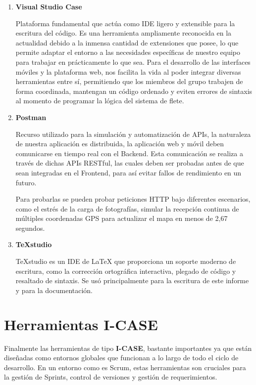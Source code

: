 \begin{enumerate}
	\item \textbf{Visual Studio Case}
	
	Plataforma fundamental que actúa como IDE ligero y extensible para la escritura del código. Es una herramienta ampliamente reconocida en la actualidad debido a la inmensa cantidad de extensiones que posee, lo que permite adaptar el entorno a las necesidades específicas de nuestro equipo para trabajar en prácticamente lo que sea. Para el desarrollo de las interfaces móviles y la plataforma web, nos facilita la vida al poder integrar diversas herramientas entre sí, permitiendo que los miembros del grupo trabajen de forma coordinada, mantengan un código ordenado y eviten errores de sintaxis al momento de programar la lógica del sistema de flete.
	
	\item \textbf{Postman}
	
	Recurso utilizado para la simulación y automatización de APIs, la naturaleza de nuestra aplicación es distribuida, la aplicación web y móvil deben comunicarse en tiempo real con el Backend. Esta comunicación se realiza a través de dichas APIs RESTful, las cuales deben ser probadas antes de que sean integradas en el Frontend, para así evitar fallos de rendimiento en un futuro.
	
	Para probarlas se pueden probar peticiones HTTP bajo diferentes escenarios, como el estrés de la carga de fotografías, simular la recepción continua de múltiples coordenadas GPS para actualizar el mapa en menos de 2,67 segundos.
	
	\item \textbf{TeXstudio} 
	
	TeXstudio es un IDE de LaTeX que proporciona un soporte moderno de escritura, como la corrección ortográfica interactiva, plegado de código y resaltado de sintaxis. Se usó principalmente para la escritura de este informe y para la documentación.
\end{enumerate}

\section{Herramientas I-CASE}

Finalmente las herramientas de tipo \textbf{I-CASE}, bastante importantes ya que están diseñadas como entornos globales que funcionan a lo largo de todo el ciclo de desarrollo. En un entorno como es Scrum, estas herramientas son cruciales para la gestión de Sprints, control de versiones y gestión de requerimientos.

